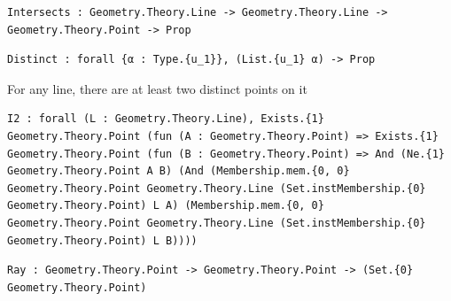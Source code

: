 \begin{definition}
  \label{Geometry.Theory.Intersects}
  \leanok
\begin{verbatim}Intersects : Geometry.Theory.Line -> Geometry.Theory.Line -> Geometry.Theory.Point -> Prop\end{verbatim}
\end{definition}

\begin{lemma}
  \label{Geometry.Theory.Distinct}
  \leanok
\begin{verbatim}Distinct : forall {α : Type.{u_1}}, (List.{u_1} α) -> Prop\end{verbatim}
\end{lemma}

\begin{lemma}
  \label{Geometry.Theory.I2}
  \leanok
  For any line, there are at least two distinct points on it 
\begin{verbatim}I2 : forall (L : Geometry.Theory.Line), Exists.{1} Geometry.Theory.Point (fun (A : Geometry.Theory.Point) => Exists.{1} Geometry.Theory.Point (fun (B : Geometry.Theory.Point) => And (Ne.{1} Geometry.Theory.Point A B) (And (Membership.mem.{0, 0} Geometry.Theory.Point Geometry.Theory.Line (Set.instMembership.{0} Geometry.Theory.Point) L A) (Membership.mem.{0, 0} Geometry.Theory.Point Geometry.Theory.Line (Set.instMembership.{0} Geometry.Theory.Point) L B))))\end{verbatim}
\end{lemma}

\begin{definition}
  \label{Geometry.Theory.Ray}
  \leanok
\begin{verbatim}Ray : Geometry.Theory.Point -> Geometry.Theory.Point -> (Set.{0} Geometry.Theory.Point)\end{verbatim}
\end{definition}


